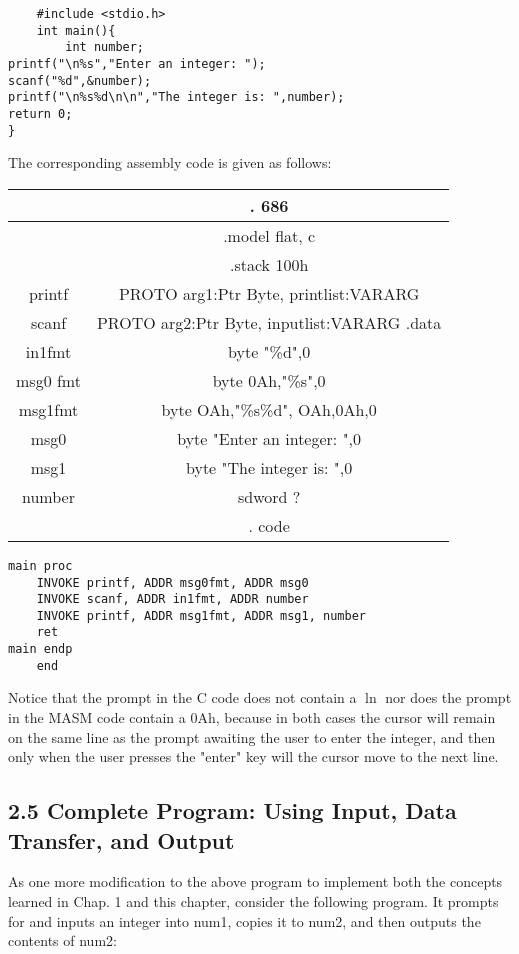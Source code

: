 \documentclass[10pt]{article}
\begin{document}
\begin{verbatim}
    #include <stdio.h>
    int main(){
        int number;
printf("\n%s","Enter an integer: ");
scanf("%d",&number);
printf("\n%s%d\n\n","The integer is: ",number);
return 0;
}
\end{verbatim}

The corresponding assembly code is given as follows:

\begin{center}
\begin{tabular}{|c|c|}
\hline
 & . 686 \\
\hline
 & .model flat, c \\
\hline
 & .stack 100h \\
\hline
printf & PROTO arg1:Ptr Byte, printlist:VARARG \\
\hline
scanf & PROTO arg2:Ptr Byte, inputlist:VARARG .data \\
\hline
in1fmt & byte "\%d",0 \\
\hline
msg0 fmt & byte 0Ah,"\%s",0 \\
\hline
msg1fmt & byte OAh,"\%s\%d", OAh,0Ah,0 \\
\hline
msg0 & byte "Enter an integer: ",0 \\
\hline
msg1 & byte "The integer is: ",0 \\
\hline
number & sdword ? \\
\hline
 & . code \\
\hline
\end{tabular}
\end{center}

\begin{verbatim}
main proc
    INVOKE printf, ADDR msg0fmt, ADDR msg0
    INVOKE scanf, ADDR in1fmt, ADDR number
    INVOKE printf, ADDR msg1fmt, ADDR msg1, number
    ret
main endp
    end
\end{verbatim}

Notice that the prompt in the C code does not contain a $\ln$ nor does the prompt in the MASM code contain a 0Ah, because in both cases the cursor will remain on the same line as the prompt awaiting the user to enter the integer, and then only when the user presses the "enter" key will the cursor move to the next line.

\subsection*{2.5 Complete Program: Using Input, Data Transfer, and Output}
As one more modification to the above program to implement both the concepts learned in Chap. 1 and this chapter, consider the following program. It prompts for and inputs an integer into num1, copies it to num2, and then outputs the contents of num2:
\end{document}
